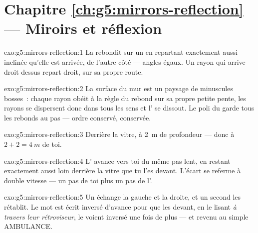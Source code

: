 \section*{Chapitre \ref{ch:g5:mirrors-reflection} --- Miroirs et réflexion}

\begin{solution}{exo:g5:mirrors-reflection:1}
La  rebondit sur un  en repartant exactement aussi
inclinée qu'elle est arrivée, de l'autre côté --- angles égaux. Un
rayon qui arrive droit dessus repart droit, sur sa propre route.
\end{solution}

\begin{solution}{exo:g5:mirrors-reflection:2}
La surface du mur est un paysage de minuscules bosses~: chaque rayon
obéit à la règle du rebond sur sa propre petite pente, les rayons se
dispersent donc dans tous les sens et l' se dissout. Le poli du
 garde tous les rebonds au pas --- ordre conservé, 
conservée.
\end{solution}

\begin{solution}{exo:g5:mirrors-reflection:3}
Derrière la vitre, à \qty{2}{m} de profondeur --- donc à
$2 + 2 = \qty{4}{m}$ de toi.
\end{solution}

\begin{solution}{exo:g5:mirrors-reflection:4}
L' avance vers toi du même pas lent, en restant exactement aussi
loin derrière la vitre que tu l'es devant. L'écart se referme à
double vitesse --- un pas de toi plus un pas de l'.
\end{solution}

\begin{solution}{exo:g5:mirrors-reflection:5}
Un  échange la gauche et la droite, et un second  les
rétablit. Le mot est écrit inversé d'avance pour que les 
devant, en le lisant \emph{à travers leur rétroviseur}, le voient
inversé une fois de plus --- et revenu au simple AMBULANCE.
\end{solution}

